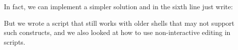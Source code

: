 In fact, we can implement a simpler solution and in the sixth line just write:

But we wrote a script that still works with older shells that may not support
such constructs, and we also looked at how to use non-interactive editing
in scripts.
